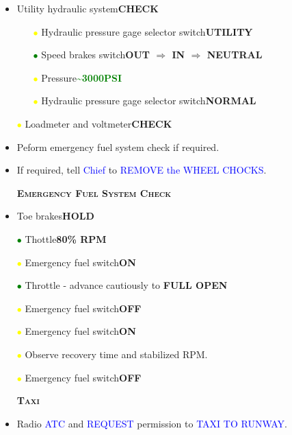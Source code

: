 \documentclass[a4paper,12pt,dvipsnames]{letter}
\newcommand{\radio}[1]{\textcolor{blue}{#1}}
\newcommand{\button}[1]{\textbf{#1}}
\newcommand{\ok}[1]{\textcolor{Green}{\textbf{#1}}}
\newcommand{\myHead}[1]{{\LARGE\textsc{\textbf{#1}}}}
\newcommand{\gi}{\textcolor{Green}{$\bullet$\;}}
\newcommand{\yi}{\textcolor{Yellow}{$\bullet$\;}}
\begin{document}
{\begin{itemize}
\begin{itemize}
  \item[\yi] Alternate-on warning light\dotfill\ok{OUT}
  \item[\yi] Hydraulic pressure gage selector switch\dotfill\button{NORMAL}
  \item[\yi] Pressure\dotfill\ok{2550\,-\,3200\;PSI}
\end{itemize}
\item Utility hydraulic system\dotfill\button{CHECK}
\begin{itemize}
  \item[\yi] Hydraulic pressure gage selector switch\dotfill\button{UTILITY}
  \item[\gi] Speed brakes switch\dotfill\button{OUT $\Rightarrow$ IN $\Rightarrow$ NEUTRAL}
  \item[\yi] Pressure\dotfill\ok{\textasciitilde3000\;PSI}
  \item[\yi] Hydraulic pressure gage selector switch\dotfill\button{NORMAL}
\end{itemize}
\item[\yi] Loadmeter and voltmeter\dotfill\button{CHECK}
\item Peform emergency fuel system check if required.
\item If required, tell \radio{Chief} to \radio{REMOVE the WHEEL CHOCKS}.
\end{itemize}
\begin{itemize}
 \item[] \myHead{Emergency Fuel System Check}
 \item Toe brakes\dotfill\button{HOLD}
 \item[\gi] Thottle\dotfill\button{80\% RPM}
 \item[\yi] Emergency fuel switch\dotfill\button{ON}
 \item[\gi] Throttle - advance cautiously to \dotfill\button{FULL OPEN}
 \item[\yi] Emergency fuel switch\dotfill\button{OFF}
 \item[\yi] Emergency fuel switch\dotfill\button{ON}
 \item[\yi] Observe recovery time and stabilized RPM.
 \item[\yi] Emergency fuel switch\dotfill\button{OFF}
\end{itemize}
\begin{itemize}
 \item[] \myHead{Taxi}
 \item Radio \radio{ATC} and \radio{REQUEST} permission to \radio{TAXI TO RUNWAY}.

\end{itemize}}
\end{document}
